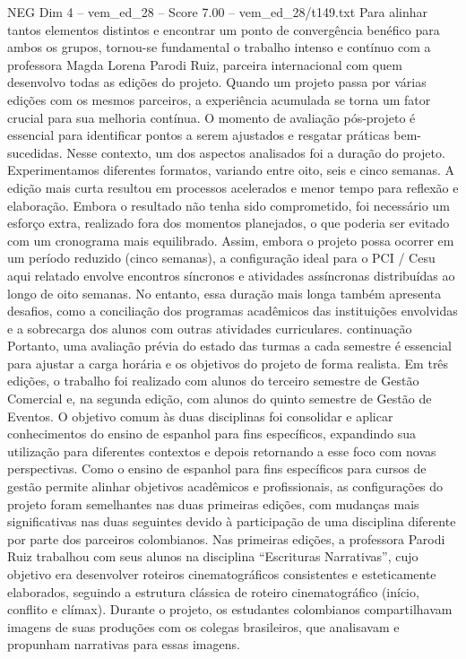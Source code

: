 \begin{textsample}{NEG Dim 4 – vem\_ed\_28 – Score 7.00 – vem\_ed\_28/t149.txt}
Para alinhar tantos elementos distintos e encontrar um ponto de convergência benéfico para ambos os grupos, tornou-se fundamental o trabalho intenso e contínuo com a professora Magda Lorena Parodi Ruiz, parceira internacional com quem desenvolvo todas as edições do projeto.
Quando um projeto passa por várias edições com os mesmos parceiros, a experiência acumulada se torna um fator crucial para sua melhoria contínua.
O momento de avaliação pós-projeto é essencial para identificar pontos a serem ajustados e resgatar práticas bem-sucedidas.
Nesse contexto, um dos aspectos analisados foi a duração do projeto.
Experimentamos diferentes formatos, variando entre oito, seis e cinco semanas.
A edição mais curta resultou em processos acelerados e menor tempo para reflexão e elaboração.
Embora o resultado não tenha sido comprometido, foi necessário um esforço extra, realizado fora dos momentos planejados, o que poderia ser evitado com um cronograma mais equilibrado.
Assim, embora o projeto possa ocorrer em um período reduzido (cinco semanas), a configuração ideal para o PCI / Cesu aqui relatado envolve encontros síncronos e atividades assíncronas distribuídas ao longo de oito semanas.
No entanto, essa duração mais longa também apresenta desafios, como a conciliação dos programas acadêmicos das instituições envolvidas e a sobrecarga dos alunos com outras atividades curriculares. continuação Portanto, uma avaliação prévia do estado das turmas a cada semestre é essencial para ajustar a carga horária e os objetivos do projeto de forma realista.
Em três edições, o trabalho foi realizado com alunos do terceiro semestre de Gestão Comercial e, na segunda edição, com alunos do quinto semestre de Gestão de Eventos.
O objetivo comum às duas disciplinas foi consolidar e aplicar conhecimentos do ensino de espanhol para fins específicos, expandindo sua utilização para diferentes contextos e depois retornando a esse foco com novas perspectivas.
Como o ensino de espanhol para fins específicos para cursos de gestão permite alinhar objetivos acadêmicos e profissionais, as configurações do projeto foram semelhantes nas duas primeiras edições, com mudanças mais significativas nas duas seguintes devido à participação de uma disciplina diferente por parte dos parceiros colombianos.
Nas primeiras edições, a professora Parodi Ruiz trabalhou com seus alunos na disciplina “Escrituras Narrativas”, cujo objetivo era desenvolver roteiros cinematográficos consistentes e esteticamente elaborados, seguindo a estrutura clássica de roteiro cinematográfico (início, conflito e clímax).
Durante o projeto, os estudantes colombianos compartilhavam imagens de suas produções com os colegas brasileiros, que analisavam e propunham narrativas para essas imagens.

\end{textsample}
